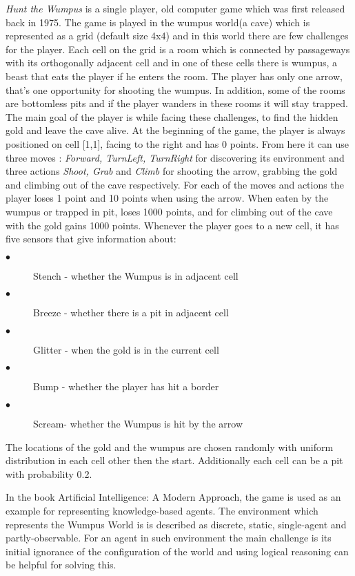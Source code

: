 \documentclass{llncs}
\newcommand{\htw}{\emph{Hunt the Wumpus }}
\begin{document}
\htw is a single player, old computer game which was first released back in 1975. The game is played in the wumpus world(a cave) which is represented as a grid (default size 4x4) and in this world there are few challenges for the player. Each cell on the grid is a room which is connected by passageways with its orthogonally adjacent cell and in one of these cells there is wumpus, a beast that eats the player if he enters the room. The player has only one arrow, that's one opportunity for shooting the wumpus. In addition, some of the rooms are bottomless pits and if the player wanders in these rooms it will stay trapped. The main goal of the player is while facing these challenges, to find the hidden gold and leave the cave alive. At the beginning of the game, the player is always positioned on cell [1,1], facing to the right and has 0 points. From here it can use three moves : \textit{Forward, TurnLeft, TurnRight} for discovering its environment and three actions \textit{Shoot, Grab} and \textit{ Climb} for shooting the arrow, grabbing the gold and climbing out of the cave respectively. For each of the moves and actions the player loses 1 point and 10 points when using the arrow. When eaten by the wumpus or trapped in pit, loses 1000 points, and for climbing out of the cave with the gold gains 1000 points. Whenever the player goes to a new cell, it has five sensors that give information about:
\begin{description}
	\item [$\bullet$] Stench - whether the Wumpus is in adjacent cell 
	\item [$\bullet$] Breeze - whether there is a pit in adjacent cell	
	\item [$\bullet$] Glitter - when the gold is in the current cell
	\item [$\bullet$] Bump - whether the player has hit a border
	\item [$\bullet$] Scream- whether the Wumpus is hit by the arrow 
\end{description}
The locations of the gold and the wumpus are chosen randomly with uniform distribution in each cell other then the start. Additionally each cell can be a pit with probability 0.2.

In the book Artificial Intelligence: A Modern Approach, the game is used as an example for representing knowledge-based agents. The environment which represents the Wumpus World is is described as discrete, static, single-agent and partly-observable. For an agent in such environment the main challenge is its initial ignorance of the configuration of the world and using logical reasoning can be helpful for solving this. 
\end{document}
